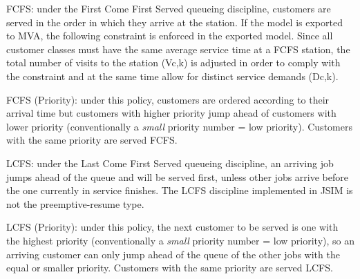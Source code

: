 \begin{description*}
\item[FCFS:] under the First Come First Served queueing discipline, customers are served in the order in which they arrive at the station. If the model is exported to MVA, the following constraint is enforced in the exported model. Since all customer classes must have the same average service time at a FCFS station, the total number of visits to the station (Vc,k) is adjusted in order to comply with the constraint and at the same time allow for distinct service demands (Dc,k).
\item[FCFS (Priority):] under this policy, customers are ordered according to their arrival time but customers with higher priority jump ahead of customers with lower priority (conventionally a \emph{small} priority number = low priority). Customers with the same priority are served FCFS.
\item[LCFS:] under the Last Come First Served queueing discipline, an arriving job jumps ahead of the queue and will be served first, unless other jobs arrive before the one currently in service finishes. The LCFS discipline implemented in JSIM is not the preemptive-resume type.
\item[LCFS (Priority):] under this policy, the next customer to be served is one with the highest priority (conventionally a \emph{small} priority number = low priority), so an arriving customer can only jump ahead of the queue of the other jobs with the equal or smaller priority. Customers with the same priority are served LCFS.
\end{description*}

